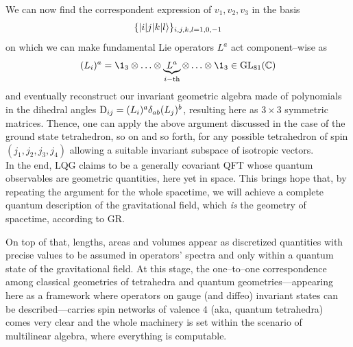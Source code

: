 We can now find the correspondent expression of $v_1,v_2,v_3$ in the basis $$\{\left| i|j|k|l \right >\}_{i,j,k,l=1,0,-1}$$
on which we can make fundamental Lie operators $L^a$ act component--wise as
$$(L_i)^a=\1_3\otimes\hdots\otimes \underbrace{L^a}_{i-\text{th}}\otimes\hdots\otimes\1_3\in\GL_{81}(\C)$$
and eventually reconstruct our invariant geometric algebra made of polynomials in the dihedral angles  $\text{\normalfont D}_{ij}=(L_i)^a\delta_{ab}(L_j)^b$, resulting here as $3\times3$ symmetric matrices. Thence, one can apply the above argument discussed in the case of the ground state tetrahedron, so on and so forth, for any possible tetrahedron of spin $(j_1,j_2,j_3,j_4)$ allowing a suitable invariant subspace of isotropic vectors.\\

In the end, LQG claims to be a generally covariant QFT whose quantum observables are geometric quantities, here yet in space. This brings hope that, by repeating the argument for the whole spacetime, we will achieve a complete quantum description of the gravitational field, which \emph{is} the geometry of spacetime, according to GR. 

On top of that, lengths, areas and volumes appear as discretized quantities with precise values to be assumed in operators' spectra and only within a quantum state of the gravitational field. At this stage, the one--to--one correspondence among classical geometries of tetrahedra and quantum geometries---appearing here as a framework where operators on gauge (and diffeo) invariant states can be described---carries spin networks of valence $4$ (aka, quantum tetrahedra) comes very clear and the whole machinery is set within the scenario of multilinear algebra, where everything is computable.
